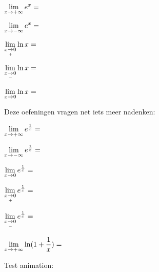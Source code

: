\documentclass{ximera}
\begin{document}
\begin{exercise}
		\begin{question} \def\isA{correct}   $\limxi    e^x = \;$            \localoefoptions \end{question}
		\begin{question} \def\isB{correct}   $\limxmi   e^x = \;$            \localoefoptions \end{question}
		\begin{question} \def\isB{correct}   $\rlimx    \ln x = \;$          \localoefoptions \end{question}
			{\reversemarginpar\marginpar{\Smiley}}
		\begin{question} \def\isE{correct}   $\llimx    \ln x = \;$          \localoefoptions \end{question}
		\begin{question} \def\isE{correct}   $\limxz    \ln x = \;$          \localoefoptions \end{question}
		Deze oefeningen vragen net iets meer nadenken:				
		\begin{question} \def\isD{correct}   $\limxi    e^{\frac 1x} = \;$   \localoefoptions \end{question}
		\begin{question} \def\isC{correct}   $\limxmi   e^{\frac 1x} = \;$   \localoefoptions \end{question}
		\begin{question} \def\isE{correct}   $\limxz     e^{\frac 1x} = \;$   \localoefoptions \end{question}
		\begin{question} \def\isA{correct}   $\rlimx    e^{\frac 1x} = \;$   \localoefoptions \end{question}
		\begin{question} \def\isC{correct}   $\llimx    e^{\frac 1x} = \;$   \localoefoptions \end{question}
		\begin{question} \def\isC{correct}   $\limxi    \ln(1+ \frac 1x) = \;$ \localoefoptions \end{question}
		
\end{exercise}

Test animation:

\setcounter{angle}{0}
\end{document}
